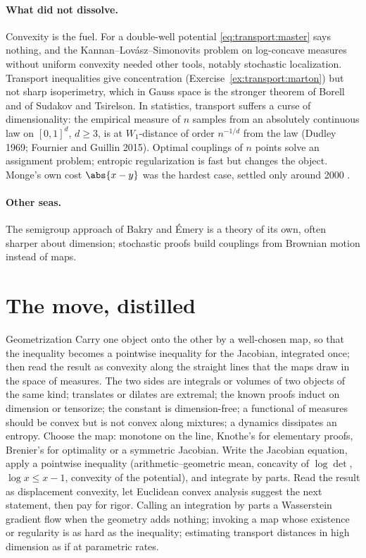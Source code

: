 \begin{refsection}
\paragraph{What did not dissolve.}
Convexity is the fuel. For a double-well potential \eqref{eq:transport:master} says nothing, and the Kannan--Lov\'asz--Simonovits problem on log-concave measures without uniform convexity needed other tools, notably stochastic localization. Transport inequalities give concentration (Exercise~\ref{ex:transport:marton}) but not sharp isoperimetry, which in Gauss space is the stronger theorem of Borell and of Sudakov and Tsirelson. In statistics, transport suffers a curse of dimensionality: the empirical measure of $n$ samples from an absolutely continuous law on $[0,1]^d$, $d\ge3$, is at $W_1$-distance of order $n^{-1/d}$ from the law (Dudley 1969; Fournier and Guillin 2015). Optimal couplings of $n$ points solve an assignment problem; entropic regularization \parencite{Cuturi2013} is fast but changes the object. Monge's own cost $\abs{x-y}$ was the hardest case, settled only around 2000 \parencite{Villani2009}.

\paragraph{Other seas.}
The semigroup approach of Bakry and \'Emery is a theory of its own, often sharper about dimension; stochastic proofs build couplings from Brownian motion instead of maps.

\section{The move, distilled}\label{sec:transport:distilled}

\begin{move}{Geometrization}
 Carry one object onto the other by a well-chosen map, so that the inequality becomes a pointwise inequality for the Jacobian, integrated once; then read the result as convexity along the straight lines that the maps draw in the space of measures.
 The two sides are integrals or volumes of two objects of the same kind; translates or dilates are extremal; the known proofs induct on dimension or tensorize; the constant is dimension-free; a functional of measures should be convex but is not convex along mixtures; a dynamics dissipates an entropy.
 Choose the map: monotone on the line, Knothe's for elementary proofs, Brenier's for optimality or a symmetric Jacobian. Write the Jacobian equation, apply a pointwise inequality (arithmetic--geometric mean, concavity of $\log\det$, $\log x\le x-1$, convexity of the potential), and integrate by parts. Read the result as displacement convexity, let Euclidean convex analysis suggest the next statement, then pay for rigor.
 Calling an integration by parts a Wasserstein gradient flow when the geometry adds nothing; invoking a map whose existence or regularity is as hard as the inequality; estimating transport distances in high dimension as if at parametric rates.
\end{move}


\end{refsection}
